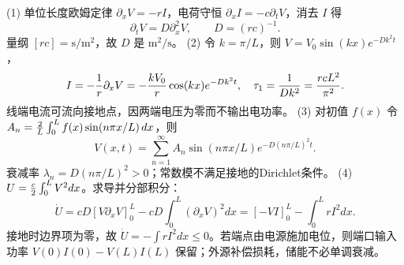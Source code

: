 (1) 单位长度欧姆定律 \(\partial_x V=-r I\)，电荷守恒 \(\partial_x I=-c\partial_t V\)，消去 \(I\) 得
\[
\partial_t V=D\partial_x^2V,\qquad D=(rc)^{-1}.
\]
量纲 \([rc]=\mathrm{s/m^2}\)，故 \(D\) 是 \(\mathrm{m^2/s}\)。
(2) 令 \(k=\pi/L\)，则 \(V=V_0\sin(kx)e^{-Dk^2t}\)，
\[
I=-{1\over r}\partial_xV=-{kV_0\over r}\cos(kx)e^{-Dk^2t},\quad \tau_1={1\over Dk^2}={rcL^2\over\pi^2}.
\]
线端电流可流向接地点，因两端电压为零而不输出电功率。
(3) 对初值 \(f(x)\) 令 \(A_n={2\over L}\int_0^Lf(x)\sin(n\pi x/L)\,dx\)，则
\[
V(x,t)=\sum_{n=1}^\infty A_n\sin(n\pi x/L)e^{-D(n\pi/L)^2t}.
\]
衰减率 \(\lambda_n=D(n\pi/L)^2>0\)；常数模不满足接地的Dirichlet条件。
(4) \(U={c\over2}\int_0^L V^2dx\)。求导并分部积分：
\[
\dot U=cD[V\partial_xV]_0^L-cD\int_0^L(\partial_xV)^2dx
=[-VI]_0^L-\int_0^LrI^2dx .
\]
接地时边界项为零，故 \(\dot U=-\int rI^2dx\le0\)。若端点由电源施加电位，则端口输入功率 \(V(0)I(0)-V(L)I(L)\) 保留；外源补偿损耗，储能不必单调衰减。

